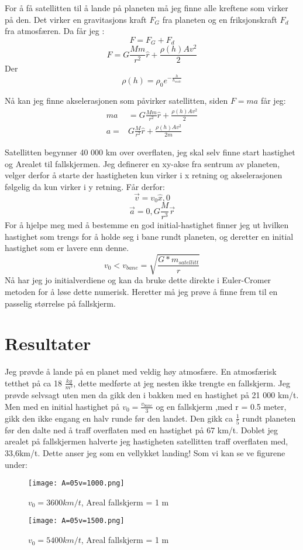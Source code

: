 \documentclass[12pt,preprint]{aastex6}
\begin{document}
\newpage
For å få satellitten til å lande på planeten må jeg finne alle kreftene som virker på den. Det virker en gravitasjons kraft $F_G$ fra planeten og en friksjonskraft $F_d$ fra atmosfæren. Da får jeg : 
$$ F = F_G+F_d$$ 
$$ F =  G\frac{Mm}{r^2}\hat{r} + \frac{\rho(h) Av^2}{2}$$
Der $$\rho(h) = \rho_0e^{-\frac{h}{h_{scale}}}$$

Nå kan jeg finne akselerasjonen som påvirker satellitten, siden $F = ma$ får jeg:
\begin{align*}
ma &= G\frac{Mm}{r^2}\hat{r} + \frac{\rho(h) Av^2}{2}\\
a =& G\frac{M}{r^2}\hat{r} + \frac{\rho(h) Av^2}{2m}
\end{align*}

Satellitten begynner 40 000 km over overflaten, jeg skal selv finne start hastighet og Arealet til fallskjermen. Jeg definerer en xy-akse fra sentrum av planeten, velger derfor å starte der hastigheten kun virker i x retning og akselerasjonen følgelig da kun virker i y retning. Får derfor:
$$\vec{v} = v_0 \hat{x}, 0$$
$$\vec{a} = 0 , G\frac{M}{r^3}\vec{r}$$
For å hjelpe meg med å bestemme en god initial-hastighet finner jeg ut hvilken hastighet som trengs for å holde seg i bane rundt planeten, og deretter en initial hastighet som er lavere enn denne. 
$$v_0 < v_{bane} = \sqrt{\frac{G*m_{satellitt}}{r}}$$
Nå har jeg jo initialverdiene og kan da bruke dette direkte i Euler-Cromer metoden for å løse dette numerisk. 
Heretter må jeg prøve å finne frem til en passelig størrelse på fallskjerm.

\section{Resultater}
Jeg prøvde å lande på en planet med veldig høy atmosfære. En atmosfærisk tetthet på ca 18 $\frac{kg}{m^3}$, dette medførte at jeg nesten ikke trengte en fallskjerm. Jeg prøvde selvsagt uten men da gikk den i bakken med en hastighet på 21 000 km/t. Men med en initial hastighet på $v_0 = \frac{v_{bane}}{3}$ og en fallskjerm ,med r = 0.5 meter, gikk den ikke engang en halv runde før den landet. Den gikk ca $\frac{1}{5}$ rundt planeten før den dalte ned å traff overflaten med en hastighet på 67 km/t. Doblet jeg arealet på fallskjermen halverte jeg hastigheten satellitten traff overflaten med, 33,6km/t. Dette anser jeg som en vellykket landing! Som vi kan se ve figurene under:

\begin{figure}[ht]
\begin{minipage}[b]{0.45\linewidth}
\centering
\texttt{[image: A=05v=1000.png]}
\caption{$v_0 = 3600 km/t$, Areal fallskjerm = 1 m}
\label{fig:figure1}
\end{minipage}
\hspace{0.5cm}
\begin{minipage}[b]{0.45\linewidth}
\centering
\texttt{[image: A=05v=1500.png]}
\caption{$v_0 = 5400 km/t$, Areal fallskjerm = 1 m}
\label{fig:figure2}
\end{minipage}
\end{figure}
\end{document}
